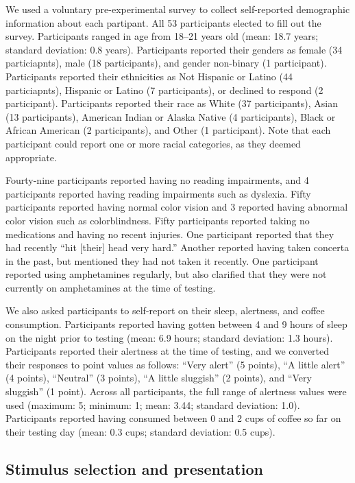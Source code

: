 \documentclass[english]{article}
\begin{document}
We used a voluntary pre-experimental survey to collect self-reported
demographic information about each partipant. All 53 participants elected to
fill out the survey. Participants ranged in age from 18--21 years old (mean:
18.7 years; standard deviation: 0.8 years). Participants reported their genders
as female (34 particiapnts), male (18 participants), and gender non-binary (1
participant). Participants reported their ethnicities as Not Hispanic or Latino
(44 particiapnts), Hispanic or Latino (7 participants), or declined to respond
(2 participant). Participants reported their race as White (37 participants),
Asian (13 participants), American Indian or Alaska Native (4 participants),
Black or African American (2 participants), and Other (1 participant). Note
that each participant could report one or more racial categories, as they
deemed appropriate.

Fourty-nine participants reported having no reading impairments, and 4
participants reported having reading impairments such as dyslexia. Fifty
participants reported having normal color vision and 3 reported having abnormal
color vision such as colorblindness. Fifty participants reported taking no
medications and having no recent injuries. One participant reported that they
had recently ``hit [their] head very hard.'' Another reported having taken
concerta in the past, but mentioned they had not taken it recently. One
participant reported using amphetamines regularly, but also clarified that they
were not currently on amphetamines at the time of testing.

We also asked participants to self-report on their sleep, alertness, and coffee
consumption. Participants reported having gotten between 4 and 9 hours of sleep
on the night prior to testing (mean: 6.9 hours; standard deviation: 1.3 hours).
Participants reported their alertness at the time of testing, and we converted
their responses to point values as follows: ``Very alert'' (5 points), ``A
little alert'' (4 points), ``Neutral'' (3 points), ``A little sluggish'' (2
points), and ``Very sluggish'' (1 point). Across all participants, the full
range of alertness values were used (maximum: 5; minimum: 1; mean: 3.44;
standard deviation: 1.0). Participants reported having consumed between 0 and 2
cups of coffee so far on their testing day (mean: 0.3 cups; standard deviation:
0.5 cups).

\subsection*{Stimulus selection and presentation} 
\end{document}
